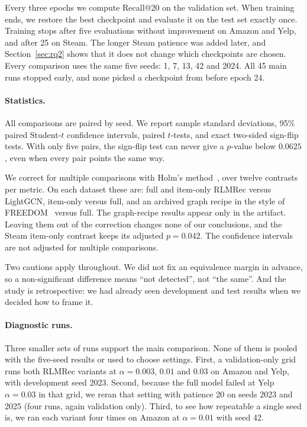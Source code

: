 \documentclass[runningheads]{llncs}
\begin{document}
Every three epochs we compute Recall@20 on the validation set. When training
ends, we restore the best checkpoint and evaluate it on the test set exactly
once. Training stops after five evaluations without improvement on Amazon and
Yelp, and after 25 on Steam. The longer Steam patience was added later, and
Section~\ref{sec:rq2} shows that it does not change which checkpoints are
chosen. Every comparison uses the same five seeds: 1, 7, 13, 42 and 2024. All
45 main runs stopped early, and none picked a checkpoint from before epoch 24.

\paragraph{Statistics.}
All comparisons are paired by seed. We report sample standard deviations, 95\%
paired Student-$t$ confidence intervals, paired $t$-tests, and exact two-sided
sign-flip tests. With only five pairs, the sign-flip test can never give a
$p$-value below $0.0625$, even when every pair points the same way.

We correct for multiple comparisons with Holm's method~\cite{holm}, over
twelve contrasts per metric. On each dataset these are: full and item-only
RLMRec versus LightGCN, item-only versus full, and an archived graph recipe in
the style of FREEDOM~\cite{freedom} versus full. The graph-recipe results
appear only in the artifact. Leaving them out of the correction changes none
of our conclusions, and the Steam item-only contrast keeps its adjusted
$p=0.042$. The confidence intervals are not adjusted for multiple comparisons.

Two cautions apply throughout. We did not fix an equivalence margin in
advance, so a non-significant difference means ``not detected'', not ``the
same''. And the study is retrospective: we had already seen development and
test results when we decided how to frame it.

\paragraph{Diagnostic runs.}
Three smaller sets of runs support the main comparison. None of them is
pooled with the five-seed results or used to choose settings. First, a
validation-only grid runs both RLMRec variants at $\alpha=0.003$, $0.01$ and
$0.03$ on Amazon and Yelp, with development seed 2023. Second, because the
full model failed at Yelp $\alpha=0.03$ in that grid, we reran that setting
with patience 20 on seeds 2023 and 2025 (four runs, again validation only).
Third, to see how repeatable a single seed is, we ran each variant four times
on Amazon at $\alpha=0.01$ with seed 42.
\end{document}
